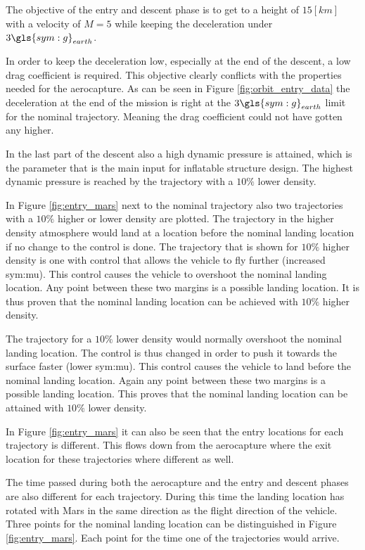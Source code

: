 The objective of the entry and descent phase is to get to a height of $15 \left[km\right]$ with a velocity of $M = 5$ while keeping the deceleration under $3 \gls{sym:g}_{earth}$.

In order to keep the deceleration low, especially at the end of the descent, a low drag coefficient is required. This objective clearly conflicts with the properties needed for the aerocapture. As can be seen in Figure \ref{fig:orbit_entry_data} the deceleration at the end of the mission is right at the $3 \gls{sym:g}_{earth}$ limit for the nominal trajectory. Meaning the drag coefficient could not have gotten any higher.

In the last part of the descent also a high dynamic pressure is attained, which is the parameter that is the main input for inflatable structure design. The highest dynamic pressure is reached by the trajectory with a $10\%$ lower density.

In Figure \ref{fig:entry_mars} next to the nominal trajectory also two trajectories with a $10\%$ higher or lower density are plotted. The trajectory in the higher density atmosphere would land at a location before the nominal landing location if no change to the control is done. The trajectory that is shown for $10\%$ higher density is one with control that allows the vehicle to fly further (increased \gls{sym:mu}). This control causes the vehicle to overshoot the nominal landing location. Any point between these two margins is a possible landing location. It is thus proven that the nominal landing location can be achieved with $10\%$ higher density.

The trajectory for a $10\%$ lower density would normally overshoot the nominal landing location. The control is thus changed in order to push it towards the surface faster (lower \gls{sym:mu}). This control causes the vehicle to land before the nominal landing location. Again any point between these two margins is a possible landing location. This proves that the nominal landing location can be attained with $10\%$ lower density.

In Figure \ref{fig:entry_mars} it can also be seen that the entry locations for each trajectory is different. This flows down from the aerocapture where the exit location for these trajectories where different as well.

The time passed during both the aerocapture and the entry and descent phases are also different for each trajectory. During this time the landing location has rotated with Mars in the same direction as the flight direction of the vehicle. Three points for the nominal landing location can be distinguished in Figure \ref{fig:entry_mars}. Each point for the time one of the trajectories would arrive.

